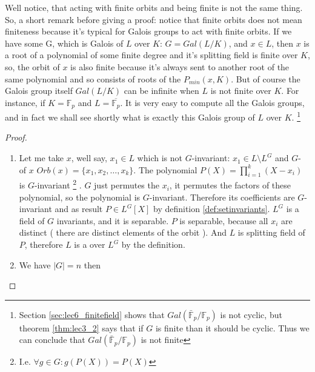 \begin{theorem}[Artin]
  \begin{remark}
    Well notice, that acting with finite orbits  and being finite is not
    the same thing. So, a short remark before giving a proof: notice
    that finite orbits does not mean finiteness because it's typical for
    Galois groups to act with finite orbits.  If we have some G, which
    is Galois of $L$ over $K$: $G = Gal\left(L/K\right)$, and
    $x \in L$, then $x$ is a root of a 
    polynomial of some finite degree  and it's splitting field is
    finite over $K$, so, the orbit of $x$ is also finite 
    because it's always sent to another root of the
    same polynomial and so consists of roots of  the
    $P_{min}\left(x, K\right)$. But of course the Galois group itself
    $Gal\left(L/K\right)$ can be infinite when $L$ is not finite over $K$. For
    instance, if  $K  = \mathbb{F}_p$ and $L = \overline{\mathbb{F}_p}$. It is
    very easy to compute all the Galois groups, and in fact we shall see
    shortly what is exactly this Galois group of $L$ over $K$.
    \footnote{
      Section \ref{sec:lec6_finitefield} shows that
      $Gal\left(\bar{\mathbb{F}}_p/\mathbb{F}_p\right)$ is not cyclic,
      but theorem \ref{thm:lec3_2} says that if $G$ is finite than it
      should be cyclic. Thus we can conclude that
      $Gal\left(\bar{\mathbb{F}}_p/\mathbb{F}_p\right)$ is not finite
    }
  \end{remark}
  \begin{proof}
    \begin{enumerate}
    \item  Let me take $x$, well say, $x_1 \in L$ which is not
      $G$-invariant: $x_1 \in L \setminus L^G$ and
      $G$- of $x$ 
      $Orb(x) = \{x_1, x_2, \dots, x_k\}$. The
      polynomial $P\left(X\right) = \prod_{i=1}^k\left(X - x_i\right)$
      is $G$-invariant
      \footnote{
        I.e. $\forall g \in G: g\left(P\left(X\right)\right) =
        P\left(X\right)$
      }
      . $G$ just permutes  the $x_i$, it permutes the factors of these
      polynomial, 
      so the polynomial is $G$-invariant. Therefore its coefficients are
      $G$-invariant and as result $P \in L^G\left[X\right]$ by
      definition \ref{def:setinvariants}. $L^G$ is a field of $G$
      invariants, and it is 
      separable. $P$ is separable, 
      because all $x_i$ are distinct ( there are distinct elements of the
      orbit ). And $L$ is splitting field of $P$, therefore $L$ is a
       over $L^G$ by the
       definition.
    \item We have $\left|G\right| = n$ then

\end{enumerate}
\end{proof}
\end{theorem}
